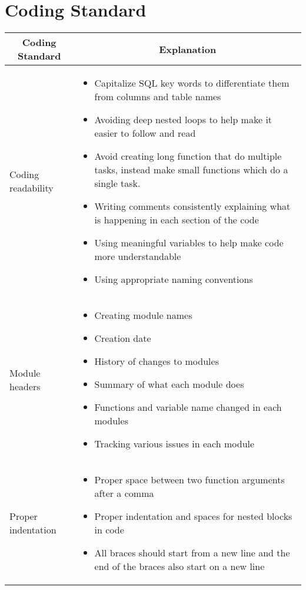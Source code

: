 \documentclass{article}
\begin{document}
\section{Coding Standard}

\begin{table}[H]
	\centering
	\begin{tabular}{|p{4cm}|p{8cm}|}
	\hline
	\multicolumn{1}{|c|}{\textbf{Coding Standard}} & \multicolumn{1}{c|}{\textbf{Explanation}} 
	\\ \hline
	Coding readability
	&  
	\begin{itemize}
		\item Capitalize SQL key words to differentiate them from columns and table names
		\item Avoiding deep nested loops to help make it easier to follow and read
		\item Avoid creating long function that do multiple tasks, instead make small functions which do a single task.
		\item Writing comments consistently explaining what is happening in each section of the code
		\item Using meaningful variables to help make code more understandable
		\item Using appropriate naming conventions
	\end{itemize}                                 
	\\ \hline
	Module headers
	&  
	\begin{itemize}
		\item Creating module names
		\item Creation date
		\item History of changes to modules
		\item Summary of what each module does
		\item Functions and variable name changed in each modules
		\item Tracking various issues in each module
	\end{itemize} 
                             
	\\ \hline
	Proper indentation
	&
	\begin{itemize}
		\item Proper space between two function arguments after a comma
		\item Proper indentation and spaces for nested blocks in code
		\item All braces should start from a new line and the end of the braces also start on a new line
	\end{itemize}
	                             
	\\ \hline
	\end{tabular}
\end{table}
\end{document}
